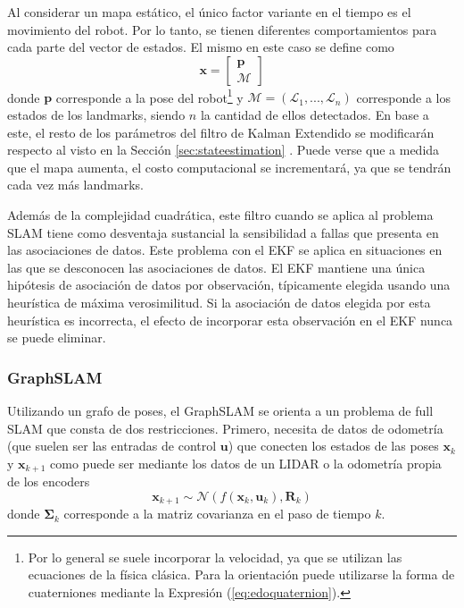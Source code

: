 Al considerar un mapa estático, el único factor variante en el tiempo es el movimiento del robot. Por lo tanto, se tienen diferentes comportamientos para cada parte del vector de estados. El mismo en este caso se define como
\begin{equation}
    \bm{x} = 
    \begin{bmatrix}
        \bm{p} \\
        \bm{\mathcal{M}}
    \end{bmatrix}
\end{equation}
donde $\bm{p}$ corresponde a la pose del robot\footnote{Por lo general se suele incorporar la velocidad, ya que se utilizan las ecuaciones de la física clásica. Para la orientación puede utilizarse la forma de cuaterniones mediante la Expresión (\ref{eq:edoquaternion}).} y $\bm{\mathcal{M}}=(\mathcal{L}_1,...,\mathcal{L}_n)$ corresponde a los estados de los landmarks, siendo $n$ la cantidad de ellos detectados. En base a este, el resto de los parámetros del filtro de Kalman Extendido se modificarán respecto al visto en la Sección \ref{sec:stateestimation} \cite{sola2014}. Puede verse que a medida que el mapa aumenta, el costo computacional se incrementará, ya que se tendrán cada vez más landmarks.

Además de la complejidad cuadrática, este filtro cuando se aplica al problema SLAM tiene como desventaja sustancial \cite{csorba1997} la sensibilidad a fallas que presenta en las asociaciones de datos. Este problema con el EKF se aplica en situaciones en las que se desconocen las asociaciones de datos. El EKF mantiene una única hipótesis de asociación de datos por observación, típicamente elegida usando una heurística de máxima verosimilitud. Si la asociación de datos elegida por esta heurística es incorrecta, el efecto de incorporar esta observación en el EKF nunca se puede eliminar.



\subsubsection{GraphSLAM}
Utilizando un grafo de poses, el GraphSLAM se orienta a un problema de full SLAM que consta de dos restricciones. Primero, necesita de datos de odometría (que suelen ser las entradas de control $\bm{u}$) que conecten los estados de las poses $\bm{x}_k$ y $\bm{x}_{k+1}$ como puede ser mediante los datos de un LIDAR o la odometría propia de los encoders
\begin{equation}
    \bm{x}_{k+1} \sim \mathcal{N}(f(\bm{x}_{k},\bm{u}_k),\bm{R}_k)
\end{equation}
donde $\bm{\Sigma}_k$ corresponde a la matriz covarianza en el paso de tiempo $k$.

